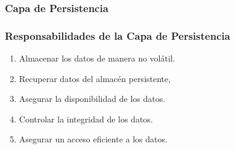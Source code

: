 \documentclass[a4paper,slidestop,xcolor=pst,blue]{beamer}
\begin{document}
\begin{frame}
    \frametitle{Capa de Persistencia}
\end{frame}

\begin{frame}[c]
	\frametitle{Responsabilidades de la Capa de Persistencia}
	\begin{enumerate}[<+->]
        \item Almacenar los datos de manera no volátil.
        \item Recuperar datos del almacén persistente,
        \item Asegurar la disponibilidad de los datos.
        \item Controlar la integridad de los datos.
        \item Asegurar un acceso eficiente a los datos.
	\end{enumerate}
\end{frame}
\end{document}
